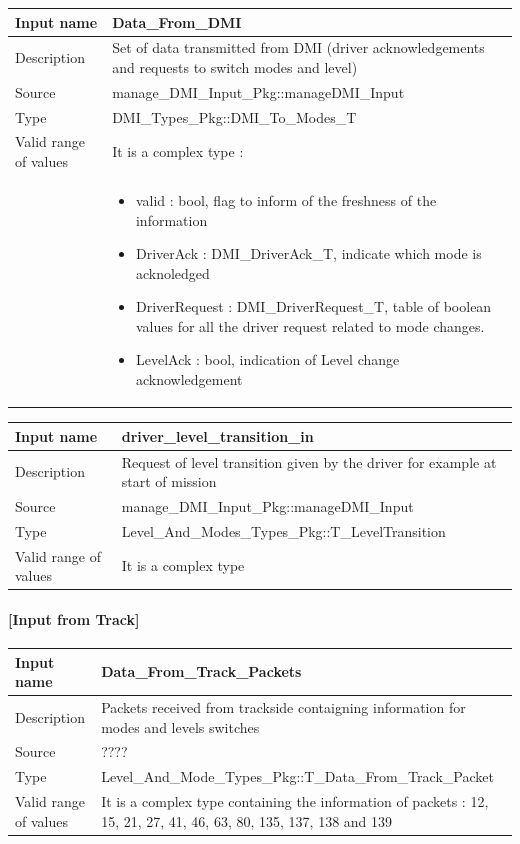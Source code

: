 \begin{longtable}{p{}p{}}
\toprule
Input name				& Data\_From\_DMI \\
\midrule
Description				& Set of data transmitted from DMI  (driver acknowledgements and requests to  switch modes and level) \\
\midrule
Source					& manage\_DMI\_Input\_Pkg::manageDMI\_Input \\ 
\midrule
Type					& DMI\_Types\_Pkg::DMI\_To\_Modes\_T \\
\midrule
Valid range of values	& It is a complex type : \\
& \begin{itemize}
\item valid :  bool,  flag to inform of the freshness of the information
\item DriverAck : DMI\_DriverAck\_T, indicate which mode is acknoledged
\item DriverRequest : DMI\_DriverRequest\_T, table of boolean values for all the driver request related to  mode changes.
\item LevelAck : bool, indication of Level  change acknowledgement
\end{itemize} \\
\bottomrule
\end{longtable}

\begin{longtable}{p{}p{}}
\toprule
Input name				& driver\_level\_transition\_in \\
\midrule
Description				& Request of level transition given by the driver for example at start of mission \\
\midrule
Source					& manage\_DMI\_Input\_Pkg::manageDMI\_Input \\ 
\midrule
Type					& Level\_And\_Modes\_Types\_Pkg::T\_LevelTransition \\
\midrule
Valid range of values	& It is a complex type \\
\bottomrule
\end{longtable}



\paragraph{[Input from Track]}

\begin{longtable}{p{}p{}}
\toprule
Input name				& Data\_From\_Track\_Packets \\
\midrule
Description				& Packets received from trackside contaigning information for modes and levels switches \\
\midrule
Source					& ???? \\ 
\midrule
Type					& Level\_And\_Mode\_Types\_Pkg::T\_Data\_From\_Track\_Packet \\
\midrule
Valid range of values	& It is a complex type containing the information of packets : 12, 15, 21, 27, 41, 46, 63, 80, 135, 137, 138 and 139 \\
\bottomrule
\end{longtable}

